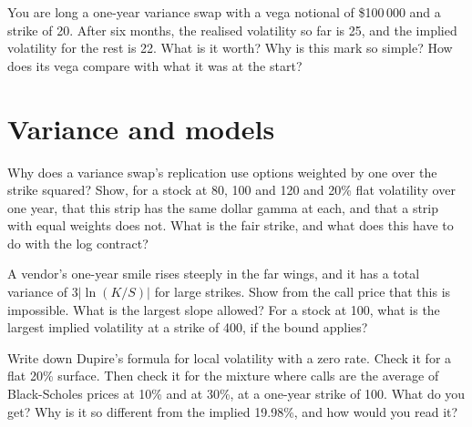 \begin{question}\label{iq:iv2:vol-surface-and-vol-trading:25}
You are long a one-year variance swap with a vega notional of \$100\,000 and a strike of 20. After six months, the realised volatility so far is 25, and the implied volatility for the rest is 22. What is it worth? Why is this mark so simple? How does its vega compare with what it was at the start?
\end{question}

\section{Variance and models}

\begin{question}\label{iq:iv2:vol-surface-and-vol-trading:26}
Why does a variance swap's replication use options weighted by one over the strike squared? Show, for a stock at 80, 100 and 120 and 20\% flat volatility over one year, that this strip has the same dollar gamma at each, and that a strip with equal weights does not. What is the fair strike, and what does this have to do with the log contract?
\end{question}

\begin{question}\label{iq:iv2:vol-surface-and-vol-trading:27}
A vendor's one-year smile rises steeply in the far wings, and it has a total variance of $3|\ln(K/S)|$ for large strikes. Show from the call price that this is impossible. What is the largest slope allowed? For a stock at 100, what is the largest implied volatility at a strike of 400, if the bound applies?
\end{question}

\begin{question}\label{iq:iv2:vol-surface-and-vol-trading:28}
Write down Dupire's formula for local volatility with a zero rate. Check it for a flat 20\% surface. Then check it for the mixture where calls are the average of Black-Scholes prices at 10\% and at 30\%, at a one-year strike of 100. What do you get? Why is it so different from the implied 19.98\%, and how would you read it?
\end{question}

